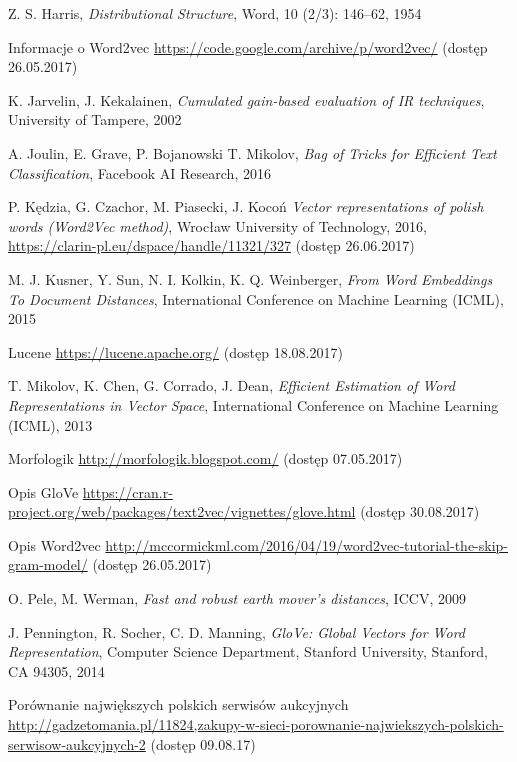 \documentclass[twoside,twocolumn]{article}
\begin{document}
\begin{thebibliography}{99}
		Z. S. Harris,
		\emph{Distributional Structure},
		Word,
		10 (2/3): 146–62,
		1954
		
		Informacje o Word2vec
		\url{https://code.google.com/archive/p/word2vec/}
		(dostęp 26.05.2017)
		
		K. Jarvelin, J. Kekalainen,
		\emph{Cumulated gain-based evaluation of IR techniques},
		University of Tampere,
		2002
		
		A. Joulin, E. Grave, P. Bojanowski T. Mikolov,
		\emph{Bag of Tricks for Efficient Text Classification},
		Facebook AI Research,
		2016
		
		P. Kędzia, G. Czachor, M. Piasecki, J. Kocoń
		\emph{Vector representations of polish words (Word2Vec method)},
		Wrocław University of Technology,
		2016,
		\url{https://clarin-pl.eu/dspace/handle/11321/327}
		(dostęp 26.06.2017)
		
		M. J. Kusner, Y. Sun, N. I. Kolkin, K. Q. Weinberger,
		\emph{From Word Embeddings To Document Distances},
		International Conference on Machine Learning (ICML),
		2015
		
		Lucene
		\url{https://lucene.apache.org/}
		(dostęp 18.08.2017)
		
		T. Mikolov, K. Chen, G. Corrado, J. Dean,
		\emph{Efficient Estimation of Word Representations in Vector Space},
		International Conference on Machine Learning (ICML),
		2013
		
		Morfologik
		\url{http://morfologik.blogspot.com/}
		(dostęp 07.05.2017)
		
		Opis GloVe
		\url{https://cran.r-project.org/web/packages/text2vec/vignettes/glove.html}
		(dostęp 30.08.2017)
		
		Opis Word2vec
		\url{http://mccormickml.com/2016/04/19/word2vec-tutorial-the-skip-gram-model/}
		(dostęp 26.05.2017)
		
		O. Pele, M. Werman,
		\emph{Fast and robust earth mover's distances},
		ICCV,
		2009
		
		J. Pennington, R. Socher, C. D. Manning,
		\emph{GloVe: Global Vectors for Word Representation},
		Computer Science Department, Stanford University, Stanford, CA 94305,
		2014
		
		Porównanie największych polskich serwisów aukcyjnych
		\url{http://gadzetomania.pl/11824,zakupy-w-sieci-porownanie-najwiekszych-polskich-serwisow-aukcyjnych-2}
		(dostęp 09.08.17)
		

\end{thebibliography}
\end{document}
